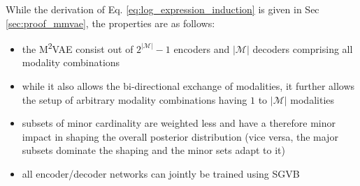 %
%
While the derivation of Eq. \ref{eq:log_expression_induction} is given in Sec \ref{sec:proof_mmvae}, the properties are as follows:
\begin{itemize}
	\item the M\textsuperscript{2}VAE consist out of $2^{|\mathcal{M}|}\!-\!1$ encoders and $|\mathcal{M}|$ decoders comprising all modality combinations
	\item while it also allows the bi-directional exchange of modalities, it further allows the setup of arbitrary modality combinations having $1$ to $|\mathcal{M}|$ modalities
	\item subsets of minor cardinality are weighted less and have a therefore minor impact in shaping the overall posterior distribution (vice versa, the major subsets dominate the shaping and the minor sets adapt to it)
	\item all encoder/decoder networks can jointly be trained using SGVB
\end{itemize}











